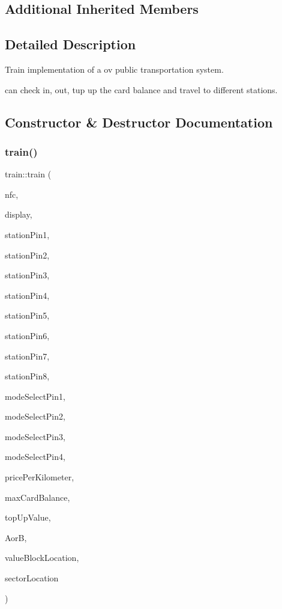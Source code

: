 \subsection*{Additional Inherited Members}


\subsection{Detailed Description}
Train implementation of a ov public transportation system. 

can check in, out, tup up the card balance and travel to different stations. 

\subsection{Constructor \& Destructor Documentation}
\mbox{\label{classtrain_ae6db22b1f686e5a4a65434a4a7157643}} 
\subsubsection{\texorpdfstring{train()}{train()}}
{\footnotesize\ttfamily train\+::train (\begin{DoxyParamCaption}\item[{\hyperlink{classnfc_1_1NFC}{nfc\+::\+N\+FC} \&}]{nfc,  }\item[{hwlib\+::terminal\+\_\+from \&}]{display,  }\item[{hwlib\+::pin\+\_\+in \&}]{station\+Pin1,  }\item[{hwlib\+::pin\+\_\+in \&}]{station\+Pin2,  }\item[{hwlib\+::pin\+\_\+in \&}]{station\+Pin3,  }\item[{hwlib\+::pin\+\_\+in \&}]{station\+Pin4,  }\item[{hwlib\+::pin\+\_\+in \&}]{station\+Pin5,  }\item[{hwlib\+::pin\+\_\+in \&}]{station\+Pin6,  }\item[{hwlib\+::pin\+\_\+in \&}]{station\+Pin7,  }\item[{hwlib\+::pin\+\_\+in \&}]{station\+Pin8,  }\item[{hwlib\+::pin\+\_\+in \&}]{mode\+Select\+Pin1,  }\item[{hwlib\+::pin\+\_\+in \&}]{mode\+Select\+Pin2,  }\item[{hwlib\+::pin\+\_\+in \&}]{mode\+Select\+Pin3,  }\item[{hwlib\+::pin\+\_\+in \&}]{mode\+Select\+Pin4,  }\item[{float}]{price\+Per\+Kilometer,  }\item[{int}]{max\+Card\+Balance,  }\item[{int}]{top\+Up\+Value,  }\item[{\hyperlink{declarations_8h_a305b1a3bcfca65e2a82f0f9d24676835}{nfc\+::mifare\+Commands}}]{AorB,  }\item[{uint8\+\_\+t}]{value\+Block\+Location,  }\item[{uint8\+\_\+t}]{sector\+Location }\end{DoxyParamCaption})}



